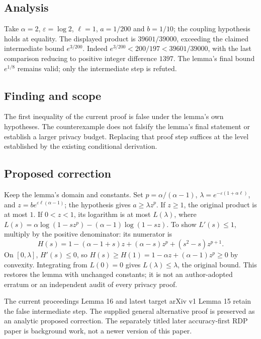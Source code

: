 \documentclass[11pt]{article}
\begin{document}
\subsection*{Analysis}

Take \(\alpha=2\), \(\varepsilon=\log2\), \(\ell=1\), \(a=1/200\) and \(b=1/10\); the coupling hypothesis holds at equality. The displayed product is \(39601/39000\), exceeding the claimed intermediate bound \(e^{3/200}\). Indeed \(e^{3/200}<200/197<39601/39000\), with the last comparison reducing to positive integer difference \(1397\). The lemma's final bound \(e^{1/8}\) remains valid; only the intermediate step is refuted.

\subsection*{Finding and scope}

The first inequality of the current proof is false under the lemma’s own hypotheses. The counterexample does not falsify the lemma’s final statement or establish a larger privacy budget. Replacing that proof step suffices at the level established by the existing conditional derivation.

\subsection*{Proposed correction}

Keep the lemma’s domain and constants. Set \(p=\alpha/(\alpha-1)\), \(\lambda=e^{-\varepsilon(1+\alpha\ell)}\), and \(z=be^{\varepsilon\ell(\alpha-1)}\); the hypothesis gives \(a\ge\lambda z^p\). If \(z\ge1\), the original product is at most \(1\). If \(0<z<1\), its logarithm is at most \(L(\lambda)\), where \(L(s)=\alpha\log(1-sz^p)-(\alpha-1)\log(1-sz)\). To show \(L'(s)\le1\), multiply by the positive denominator: its numerator is \[H(s)=1-(\alpha-1+s)z+(\alpha-s)z^p+(s^2-s)z^{p+1}.\] On \([0,\lambda]\), \(H'(s)\le0\), so \(H(s)\ge H(1)=1-\alpha z+(\alpha-1)z^p\ge0\) by convexity. Integrating from \(L(0)=0\) gives \(L(\lambda)\le\lambda\), the original bound. This restores the lemma with unchanged constants; it is not an author-adopted erratum or an independent audit of every privacy proof.

The current proceedings Lemma 16 and latest target arXiv v1 Lemma 15 retain the false intermediate step. The supplied general alternative proof is preserved as an analytic proposed correction. The separately titled later accuracy-first RDP paper is background work, not a newer version of this paper.
\end{document}
